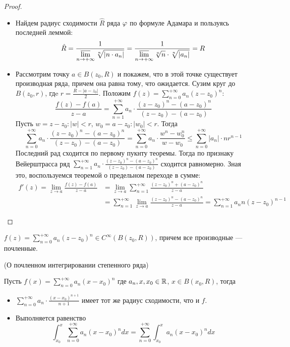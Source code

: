\begin{proof}
    \enewline
    \begin{itemize}
        \item Найдем радиус сходимости $\hat{R}$ ряда $\varphi$ по формуле Адамара и
        пользуясь последней леммой:
\[
    \hat{R} = \frac{1}{\displaystyle \varlimsup_{n \to +\infty}{\sqrt[n]{|n
    \cdot a_n|}}} = \frac{1}{\displaystyle \varlimsup_{n \to
    +\infty}{\sqrt[n]{n} \cdot \sqrt[n]{|a_n|}}} = R
\]
        \item Рассмотрим точку $a \in B(z_0, R)$ и покажем, что в этой точке
        существует производная ряда, причем она равна тому, что ожидается.
        Сузим круг до $B(z_0, r)$, гдe $r = \frac{R - |a - z_0|}{2}$.
        Положим $\displaystyle f(z) = \sum_{n = 0}^{+\infty}{a_n(z - z_0)^n}$:
\[
    \frac{f(z) - f(a)}{z - a} = \sum_{n = 1}^{+\infty}{a_n \cdot
    \frac{(z - z_0)^n - (a - z_0)^n}{(z - z_0) - (a - z_0)}}
\]
    Пусть $w = z - z_0: |w| < r$, $w_0 = a - z_0: |w_0| < r$. Тогда
\[
    \sum_{n = 0}^{+\infty}{a_n \cdot \frac{(z - z_0)^n - (a - z_0)^n}{(z - z_0)
    - (a - z_0)}}
    = \sum_{n = 0}^{+\infty}{a_n \cdot \frac{w^n - w^n_0}{w - w_0}}
    \leqslant \sum_{n = 0}^{+\infty}{|a_n| \cdot nr^{n - 1}}
\]
    Последний рад сходится по первому пукнту теоремы. Тогда по признаку
    Вейерштрасса ряд $\displaystyle \sum_{n = 1}^{+\infty}{a_n \cdot
    \frac{(z - z_0)^n - (a - z_0)^n}{(z - z_0) - (a - z_0)}}$
    сходится равномерно. Зная это, воспользуемся теоремой о предельном переходе
    в сумме:
\begin{align*}
    f'(z) = \lim_{z \to a}{\frac{f(z) - f(a)}{z - a}} &= \lim_{z \to a}
    {\sum_{n = 1}^{+\infty}{\frac{(z - z_0)^n + (a - z_0)^n}{z - a}}}
    \\ &= \sum_{n = 1}^{+\infty}{\lim_{z \to a}{\frac{(z - z_0)^n - (a -
    z_0)^n}{z - a}}} = \sum_{n = 1}^{+\infty}{a_n n(z - z_0)^{n - 1}}
\end{align*}
    \end{itemize}
\end{proof}

\begin{corollary}
    $\displaystyle f(z) = \sum_{n = 0}^{+\infty}{a_n(z - z_0)^n} \in
    C^{\infty}(B(z_0, R))$, причем все производные --- почленные.
\end{corollary}

\begin{corollary}(О почленном интегрировании степенного ряда)

    Пусть $f(x) = \displaystyle \sum_{n = 0}^{+\infty}{a_n (x - x_0)^n}$ где
    $a_n, x, x_0 \in \mathbb{R}$, $x \in B(x_0, R)$, тогда
\begin{itemize}
    \item $\displaystyle \sum_{n = 0}^{+\infty}{a_n \cdot \frac{(x - x_0)^{n +
    1}}{n + 1}}$ имеет тот же радиус сходимости, что и $f$.
    \item Выполняется равенство
\[
    \int_{x_0}^{x}{\sum_{n = 0}^{+\infty}{a_n (x - x_0)^n} dx}
    = \sum_{n = 0}^{+\infty}{\int_{x_0}^{x}{a_n(x - x_0)^n dx}}
\]
\end{itemize}
\end{corollary}

